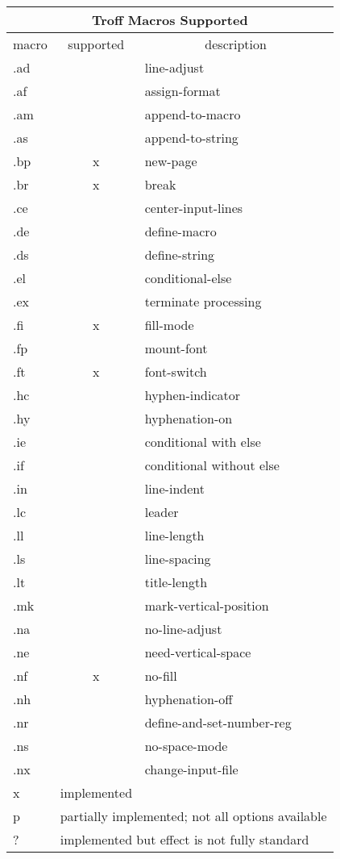 \noindent
\begin{center}
\begin{tabular}{|l|c|l|}
\hline
\multicolumn{3}{|c|}{{\vrule height12pt width0pt depth3.5pt\Large
Troff Macros Supported}}\\ 
\hline\hline
macro&	 supported&\multicolumn{1}{|c|}{description}\\
\hline
.ad&	&		line-adjust\\
.af&	&		assign-format\\
.am&	&		append-to-macro\\
.as&	&		append-to-string\\
.bp&	x&		new-page\\
.br&	x&		break\\
.ce&	&		center-input-lines\\
.de&	&		define-macro\\
.ds&	&		define-string\\
.el&	&		conditional-else\\
.ex&	&		terminate processing\\
.fi&	x&		fill-mode\\
.fp&	&		mount-font\\
.ft&	x&		font-switch\\
.hc&	&		hyphen-indicator\\
.hy&	&		hyphenation-on\\
.ie&	&		conditional with else\\
.if&	&		conditional without else\\
.in&	&		line-indent\\
.lc&	&		leader\\
.ll&	&		line-length\\
.ls&	&		line-spacing\\
.lt&	&		title-length\\
.mk&	&		mark-vertical-position\\
.na&	&		no-line-adjust\\
.ne&	&		need-vertical-space\\
.nf&	x&		no-fill\\
.nh&	&		hyphenation-off\\
.nr&	&		define-and-set-number-reg\\
.ns&	&		no-space-mode\\
.nx&	&		change-input-file\\
\hline
\hline
x&\multicolumn{2}{|l|}{implemented}\\
p&\multicolumn{2}{|l|}{partially implemented; not all options available}\\
?&\multicolumn{2}{|l|}{implemented but effect is not fully standard}\\
\hline
\end{tabular}\end{center}
\medskip
